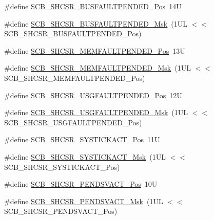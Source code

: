 \begin{DoxyCompactItemize}
\item 
\#define \mbox{\hyperlink{group___c_m_s_i_s___s_c_b_gaa22551e24a72b65f1e817f7ab462203b}{S\+C\+B\+\_\+\+S\+H\+C\+S\+R\+\_\+\+B\+U\+S\+F\+A\+U\+L\+T\+P\+E\+N\+D\+E\+D\+\_\+\+Pos}}~14U
\item 
\#define \mbox{\hyperlink{group___c_m_s_i_s___s_c_b_ga677c23749c4d348f30fb471d1223e783}{S\+C\+B\+\_\+\+S\+H\+C\+S\+R\+\_\+\+B\+U\+S\+F\+A\+U\+L\+T\+P\+E\+N\+D\+E\+D\+\_\+\+Msk}}~(1\+U\+L $<$$<$ S\+C\+B\+\_\+\+S\+H\+C\+S\+R\+\_\+\+B\+U\+S\+F\+A\+U\+L\+T\+P\+E\+N\+D\+E\+D\+\_\+\+Pos)
\item 
\#define \mbox{\hyperlink{group___c_m_s_i_s___s_c_b_gaceb60fe2d8a8cb17fcd1c1f6b5aa924f}{S\+C\+B\+\_\+\+S\+H\+C\+S\+R\+\_\+\+M\+E\+M\+F\+A\+U\+L\+T\+P\+E\+N\+D\+E\+D\+\_\+\+Pos}}~13U
\item 
\#define \mbox{\hyperlink{group___c_m_s_i_s___s_c_b_ga9abc6c2e395f9e5af4ce05fc420fb04c}{S\+C\+B\+\_\+\+S\+H\+C\+S\+R\+\_\+\+M\+E\+M\+F\+A\+U\+L\+T\+P\+E\+N\+D\+E\+D\+\_\+\+Msk}}~(1\+U\+L $<$$<$ S\+C\+B\+\_\+\+S\+H\+C\+S\+R\+\_\+\+M\+E\+M\+F\+A\+U\+L\+T\+P\+E\+N\+D\+E\+D\+\_\+\+Pos)
\item 
\#define \mbox{\hyperlink{group___c_m_s_i_s___s_c_b_ga3cf03acf1fdc2edc3b047ddd47ebbf87}{S\+C\+B\+\_\+\+S\+H\+C\+S\+R\+\_\+\+U\+S\+G\+F\+A\+U\+L\+T\+P\+E\+N\+D\+E\+D\+\_\+\+Pos}}~12U
\item 
\#define \mbox{\hyperlink{group___c_m_s_i_s___s_c_b_ga122b4f732732010895e438803a29d3cc}{S\+C\+B\+\_\+\+S\+H\+C\+S\+R\+\_\+\+U\+S\+G\+F\+A\+U\+L\+T\+P\+E\+N\+D\+E\+D\+\_\+\+Msk}}~(1\+U\+L $<$$<$ S\+C\+B\+\_\+\+S\+H\+C\+S\+R\+\_\+\+U\+S\+G\+F\+A\+U\+L\+T\+P\+E\+N\+D\+E\+D\+\_\+\+Pos)
\item 
\#define \mbox{\hyperlink{group___c_m_s_i_s___s_c_b_gaec9ca3b1213c49e2442373445e1697de}{S\+C\+B\+\_\+\+S\+H\+C\+S\+R\+\_\+\+S\+Y\+S\+T\+I\+C\+K\+A\+C\+T\+\_\+\+Pos}}~11U
\item 
\#define \mbox{\hyperlink{group___c_m_s_i_s___s_c_b_gafef530088dc6d6bfc9f1893d52853684}{S\+C\+B\+\_\+\+S\+H\+C\+S\+R\+\_\+\+S\+Y\+S\+T\+I\+C\+K\+A\+C\+T\+\_\+\+Msk}}~(1\+U\+L $<$$<$ S\+C\+B\+\_\+\+S\+H\+C\+S\+R\+\_\+\+S\+Y\+S\+T\+I\+C\+K\+A\+C\+T\+\_\+\+Pos)
\item 
\#define \mbox{\hyperlink{group___c_m_s_i_s___s_c_b_ga9b9fa69ce4c5ce7fe0861dbccfb15939}{S\+C\+B\+\_\+\+S\+H\+C\+S\+R\+\_\+\+P\+E\+N\+D\+S\+V\+A\+C\+T\+\_\+\+Pos}}~10U
\item 
\#define \mbox{\hyperlink{group___c_m_s_i_s___s_c_b_gae0e837241a515d4cbadaaae1faa8e039}{S\+C\+B\+\_\+\+S\+H\+C\+S\+R\+\_\+\+P\+E\+N\+D\+S\+V\+A\+C\+T\+\_\+\+Msk}}~(1\+U\+L $<$$<$ S\+C\+B\+\_\+\+S\+H\+C\+S\+R\+\_\+\+P\+E\+N\+D\+S\+V\+A\+C\+T\+\_\+\+Pos)
$$
\end{DoxyCompactItemize}
